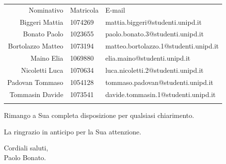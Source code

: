 \documentclass[a4paper]{article}
\begin{document}
	\begin{table}[H]
			\begin{tabularx}{\textwidth}{r l k}
				Nominativo & Matricola & E-mail \\
				Biggeri Mattia & 1074269 & mattia.biggeri@studenti.unipd.it \\
				Bonato Paolo & 1023655 & paolo.bonato.3@studenti.unipd.it\\
				Bortolazzo Matteo & 1073194 & matteo.bortolazzo.1@studenti.unipd.it \\
				Maino Elia & 1069880 & elia.maino@studenti.unipd.it \\
				Nicoletti Luca & 1070634 & luca.nicoletti.2@studenti.unipd.it \\
				Padovan Tommaso & 1054128 & tommaso.padovan@studenti.unipd.it \\
				Tommasin Davide & 1073541 & davide.tommasin.1@studenti.unipd.it \\
			\end{tabularx}
			\label{ComponentiGruppo}
	\end{table}
	\begin{flushleft}
		Rimango a Sua completa disposizione per qualsiasi chiarimento.
	\end{flushleft}
	\begin{flushleft}
		La ringrazio in anticipo per la Sua attenzione.
	\end{flushleft}
	\begin{center}
		Cordiali saluti,\\
		Paolo Bonato.
	\end{center}
	
\end{document}
